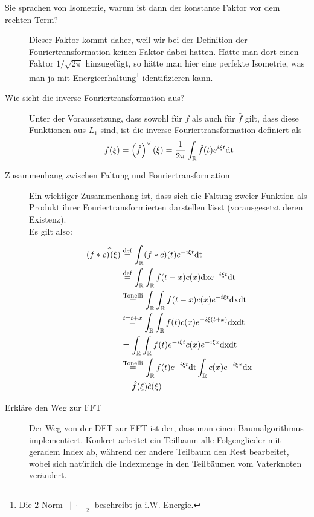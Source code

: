 \begin{description}
  \item[Sie sprachen von Isometrie, warum ist dann der konstante Faktor vor dem rechten Term?]
    Dieser Faktor kommt daher, weil wir bei der Definition der Fouriertransformation keinen Faktor
    dabei hatten. Hätte man dort einen Faktor $1/\sqrt{2\pi}$ hinzugefügt, so hätte man hier eine
    perfekte Isometrie, was man ja mit Energieerhaltung\footnote{Die $2$-Norm $\|\cdot\|_2$ 
    beschreibt ja i.W. Energie.} identifizieren kann.
\item[Wie sieht die inverse Fouriertransformation aus?]
    Unter der Voraussetzung, dass sowohl für $f$ als auch für $\hat f$ gilt, dass
    diese Funktionen aus $L_1$ sind, ist die inverse Fouriertransformation 
    definiert als
    $$ f(\xi) = \left(\hat f\right)^{\lor{}}(\xi) = \frac{1}{2\pi}\int_{\mathbb{R}} \hat f(t)e^{i\xi 
    t}\text{dt} $$      
\item[Zusammenhang zwischen Faltung und Fouriertransformation]
    Ein wichtiger Zusammenhang ist, dass sich die Faltung zweier Funktion als Produkt ihrer 
    Fouriertransformierten darstellen lässt (vorausgesetzt deren Existenz).\\
    Es gilt also:
    
    \begin{equation*}
      \begin{split}
        (f*c)^{\widehat{}}(\xi) &\stackrel{\mathrm{def}}= \int_{\mathbb{R}} (f*c)(t) e^{-i\xi t}\text{dt} \\
        &\stackrel{\mathrm{def}}= \int_{\mathbb{R}} \int_{\mathbb{R}} f(t-x)c(x)\text{dx} e^{-i\xi t} \text{dt} \\
        &\stackrel{\mathrm{Tonelli}}= \int_{\mathbb{R}} \int_{\mathbb{R}} f(t-x)c(x) e^{-i\xi t} \text{dx}\text{dt} \\
        &\stackrel{t=t+x}= \int_{\mathbb{R}} \int_{\mathbb{R}} f(t)c(x) e^{-i\xi (t+x)} \text{dx}\text{dt} \\
        &= \int_{\mathbb{R}} \int_{\mathbb{R}} f(t)e^{-i\xi t} c(x) e^{-i\xi x} \text{dx}\text{dt} \\
        &\stackrel{\mathrm{Tonelli}}= \int_{\mathbb{R}} f(t)e^{-i\xi t} \text{dt}\int_{\mathbb{R}} c(x) e^{-i\xi x} 
        \text{dx} \\ 
        &= \hat f(\xi) \hat c(\xi)
      \end{split}
    \end{equation*}

	\item[Erkläre den Weg zur FFT]
      Der Weg von der DFT zur FFT ist der, dass man einen Baumalgorithmus implementiert. Konkret arbeitet
      ein Teilbaum alle Folgenglieder mit geradem Index ab, während der andere Teilbaum den Rest bearbeitet,
      wobei sich natürlich die Indexmenge in den Teilbäumen vom Vaterknoten verändert.


\end{description}
